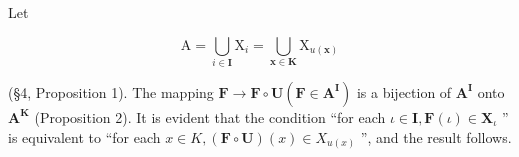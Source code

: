Let

\[
\mathrm{A} = \bigcup_ {i \in \mathbf {I}} \mathrm{X} _ {i} = \bigcup_ {\boldsymbol {x} \in \mathbf {K}} \mathrm{X} _ {u (\boldsymbol {x})}
\]

(§4, Proposition 1). The mapping \(\mathbf{F} \to \mathbf{F} \circ \mathbf{U} (\mathbf{F} \in \mathbf{A}^{\mathbf{I}})\) is a bijection of \(\mathbf{A}^{\mathbf{I}}\) onto \(\mathbf{A}^{\mathbf{K}}\) (Proposition 2). It is evident that the condition ``for each \(\iota \in \mathbf{I}, \mathbf{F}(\iota) \in \mathbf{X}_{\iota}\) '' is equivalent to ``for each \(x \in K, (\mathbf{F} \circ \mathbf{U})(x) \in X_{u(x)}\) '', and the result follows.

